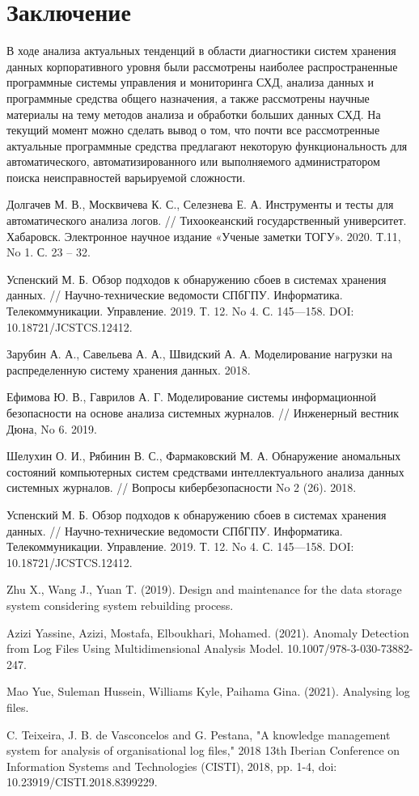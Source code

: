 \documentclass[12pt,a4paper]{article}
\begin{document}
\section*{Заключение}
В ходе анализа актуальных тенденций в области диагностики систем хранения данных корпоративного уровня были рассмотрены наиболее распространенные программные системы управления и мониторинга СХД, анализа данных и программные средства общего назначения, а также рассмотрены научные материалы на тему методов анализа и обработки больших данных СХД. На текущий момент можно сделать вывод о том, что почти все рассмотренные актуальные программные средства предлагают некоторую функциональность для автоматического, автоматизированного или выполняемого администратором поиска неисправностей варьируемой сложности.


\begin{thebibliography}{10}
Долгачев М. В., Москвичева К. С., Селезнева Е. А. Инструменты и тесты для автоматического анализа логов. // Тихоокеанский государственный университет. Хабаровск. Электронное научное издание «Ученые заметки ТОГУ». 2020. Т.11, No 1. С. 23 – 32.

Успенский М. Б. Обзор подходов к обнаружению сбоев в системах хранения данных. // Научно-технические ведомости СПбГПУ. Информатика. Телекоммуникации. Управление. 2019. Т. 12. No 4. С. 145—158. 
DOI: 10.18721/JCSTCS.12412.

Зарубин А. А., Савельева А. А., Швидский А. А. Моделирование нагрузки на распределенную систему хранения данных. 2018.

Ефимова Ю. В., Гаврилов А. Г. Моделирование системы информационной безопасности на основе анализа системных журналов. // Инженерный вестник Дюна, No 6. 2019.

Шелухин О. И., Рябинин В. С., Фармаковский М. А. Обнаружение аномальных состояний компьютерных систем средствами интеллектуального анализа данных системных журналов. // Вопросы кибербезопасности No 2 (26). 2018.

Успенский М. Б. Обзор подходов к обнаружению сбоев в системах хранения данных. // Научно-технические ведомости СПбГПУ. Информатика. Телекоммуникации. Управление. 2019. Т. 12. No 4. С. 145—158. DOI: 10.18721/JCSTCS.12412.

Zhu X., Wang J., Yuan T. (2019). Design and maintenance for the data storage system considering system rebuilding process.

Azizi Yassine, Azizi, Mostafa, Elboukhari, Mohamed. (2021). Anomaly Detection from Log Files Using Multidimensional Analysis Model. 10.1007/978-3-030-73882-247.

Mao Yue, Suleman Hussein, Williams Kyle, Paihama Gina. (2021). Analysing log files.

C. Teixeira, J. B. de Vasconcelos and G. Pestana, "A knowledge management system for analysis of organisational log files," 2018 13th Iberian Conference on Information Systems and Technologies (CISTI), 2018, pp. 1-4, doi: 10.23919/CISTI.2018.8399229.


\end{thebibliography}
\end{document}
